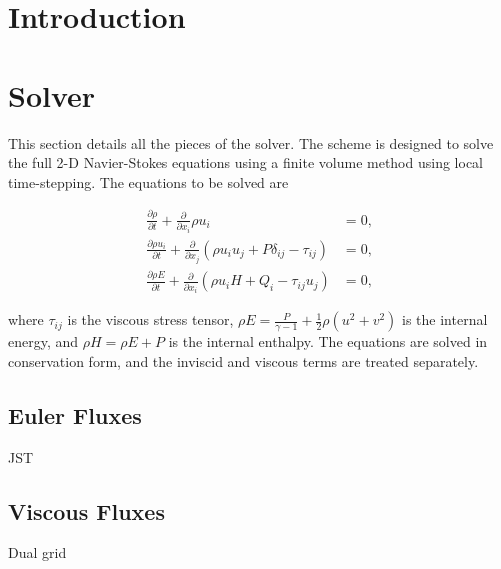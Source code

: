 \documentclass{article}
\begin{document}



\section{Introduction}

\section{Solver}
This section details all the pieces of the solver. The scheme is designed to solve the full 2-D Navier-Stokes equations using a finite volume method using local time-stepping. The equations to be solved are

\begin{equation}
\begin{aligned}
\frac{\partial \rho}{\partial t} + \frac{\partial}{\partial x_i} \rho u_i &= 0, \\
\frac{\partial \rho u_i}{\partial t} + \frac{\partial}{\partial x_j}\left(\rho u_iu_j + P\delta_{ij} - \tau_{ij} \right) &= 0, \\
\frac{\partial \rho E}{\partial t} + \frac{\partial}{\partial x_i}\left(\rho u_i H + Q_i - \tau_{ij}u_j\right) &= 0,
\end{aligned}
\end{equation}

where $\tau_{ij}$ is the viscous stress tensor, $\rho E=\frac{P}{\gamma-1}+\frac{1}{2}\rho(u^2+v^2)$ is the internal energy, and $\rho H=\rho E+P$ is the internal enthalpy. The equations are solved in conservation form, and the inviscid and viscous terms are treated separately.

\subsection{Euler Fluxes}
JST

\subsection{Viscous Fluxes}
Dual grid
\end{document}
